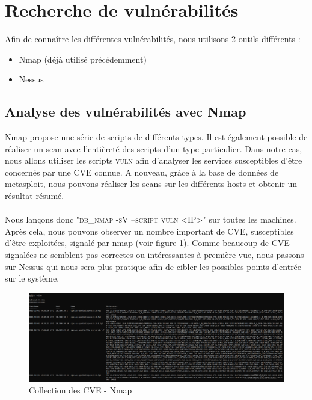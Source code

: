 \documentclass[a4paper]{article}
\begin{document}
\newpage
\section{Recherche de vulnérabilités} \label{sec:vulnsearch}
Afin de connaître les différentes vulnérabilités, nous utilisons 2 outils différents :
\begin{itemize}
    \item Nmap (déjà utilisé précédemment)
    \item Nessus
\end{itemize}

\subsection{Analyse des vulnérabilités avec Nmap}
    Nmap propose une série de scripts de différents types. Il est également possible de réaliser un scan avec l'entièreté des scripts d'un type particulier. Dans notre cas, nous allons utiliser les scripts \textsc{vuln} afin d'analyser les services susceptibles d'être concernés par une CVE connue. A nouveau, grâce à la base de données de metasploit, nous pouvons réaliser les scans sur les différents hosts et obtenir un résultat résumé.\\ \\
    Nous lançons donc "\textsc{db\_nmap -sV --script vuln <IP>}" sur toutes les machines. Après cela, nous pouvons observer un nombre important de CVE, susceptibles d'être exploitées, signalé par nmap (voir figure \ref{fig:vulnsnmap}). Comme beaucoup de CVE signalées ne semblent pas correctes ou intéressantes à première vue, nous passons sur Nessus qui nous sera plus pratique afin de cibler les possibles points d'entrée sur le système.

\begin{figure}[H]
    \centering
    \includegraphics[width=1\textwidth]{images/lab3/resume.png}
    \caption{Collection des CVE - Nmap}
    \label{fig:vulnsnmap}
\end{figure}
\end{document}
